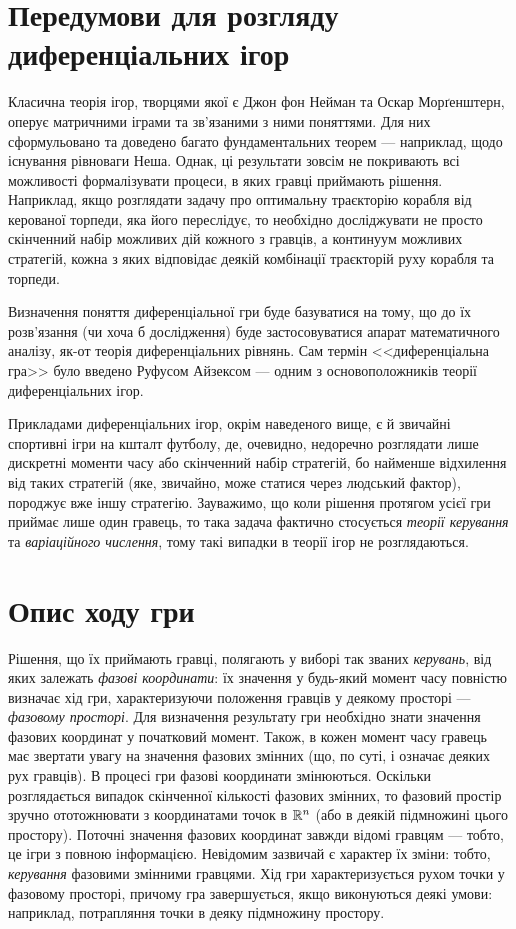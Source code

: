 
\section{Передумови для розгляду диференціальних ігор}
Класична теорія ігор, творцями якої є Джон фон Нейман та Оскар Морґенштерн,
оперує матричними іграми та зв'язаними з ними поняттями. Для них сформульовано та доведено
багато фундаментальних теорем --- наприклад, щодо існування рівноваги Неша. 
Однак, ці результати зовсім не покривають всі можливості формалізувати процеси,
в яких гравці приймають рішення. Наприклад, якщо розглядати задачу про оптимальну траєкторію 
корабля від керованої торпеди, яка його переслідує, то необхідно досліджувати не просто скінченний набір можливих дій
кожного з гравців, а континуум можливих стратегій, кожна з яких відповідає деякій комбінації траєкторій руху корабля та торпеди.

Визначення поняття диференціальної гри буде базуватися на тому, що до їх розв'язання (чи хоча б дослідження)
буде застосовуватися апарат математичного аналізу, як-от теорія диференціальних рівнянь.
Сам термін <<диференціальна гра>> було введено Руфусом Айзексом --- одним з основоположників теорії диференціальних ігор.

Прикладами диференціальних ігор, окрім наведеного вище, є й звичайні спортивні ігри на кшталт футболу,
де, очевидно, недоречно розглядати лише дискретні моменти часу або скінченний набір стратегій,
бо найменше відхилення від таких стратегій (яке, звичайно, може статися через людський фактор),
породжує вже іншу стратегію. Зауважимо, що коли рішення протягом усієї гри приймає лише один гравець,
то така задача фактично стосується \emph{теорії керування} та \emph{варіаційного числення}, тому такі випадки в
теорії ігор не розглядаються. 

\section{Опис ходу гри}
Рішення, що їх приймають гравці, полягають у виборі так званих \emph{керувань}, від яких залежать
\emph{фазові координати}: їх значення у будь-який момент часу повністю визначає хід гри, характеризуючи
положення гравців у деякому просторі --- \emph{фазовому просторі}.
Для визначення результату гри необхідно знати значення фазових координат у початковий момент. Також, в кожен момент часу
гравець має звертати увагу на значення фазових змінних (що, по суті, і означає деяких рух гравців).
В процесі гри фазові координати змінюються. Оскільки розглядається випадок скінченної кількості фазових змінних,
то фазовий простір зручно ототожнювати з координатами точок в $\mathbb{R}^n$ (або в деякій підмножині цього простору).
Поточні значення фазових координат завжди відомі гравцям --- тобто, це ігри з повною інформацією.
Невідомим зазвичай є характер їх зміни: тобто, \emph{керування} фазовими змінними гравцями.
Хід гри характеризується рухом точки у фазовому просторі, причому гра завершується, якщо виконуються деякі умови: наприклад,
потрапляння точки в деяку підмножину простору.

